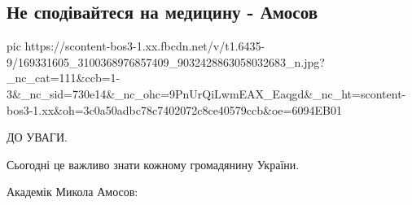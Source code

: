  
 
 
 
 

\subsection{Не сподівайтеся на медицину - Амосов}
\label{sec:06_04_2021.fb.mironenko_petr.1.amosov}

\ifcmt
  pic https://scontent-bos3-1.xx.fbcdn.net/v/t1.6435-9/169331605_3100368976857409_9032428863058032683_n.jpg?_nc_cat=111&ccb=1-3&_nc_sid=730e14&_nc_ohc=9PnUrQiLwmEAX_Eaqgd&_nc_ht=scontent-bos3-1.xx&oh=3c0a50adbc78c7402072c8ce40579ccb&oe=6094EB01
\fi


ДО УВАГИ.

Сьогодні це важливо знати кожному громадянину України.

Академік Микола Амосов:

